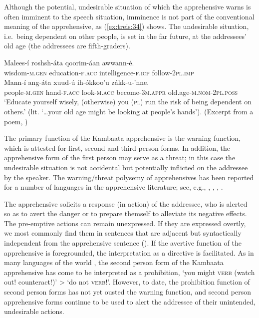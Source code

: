\documentclass[output=paper,colorlinks,citecolor=brown,
]{langsci/langscibook}
\begin{document}
Although the potential, undesirable situation of which the apprehensive warns is often imminent to the speech situation, imminence is not part of the conventional meaning of the apprehensive, as (\ref{ex:treis:34}) shows. The undesirable situation,  i.e.~being dependent on other people, is set in the far future, at the addressees' old age (the addressees are fifth-graders).

\ea\label{ex:treis:34} 
\gll Malees-í 			roshsh-áta 			qoorim-áan 		awwann-é. \\ 
wisdom-\textsc{m.gen} education-\textsc{f.acc}	intelligence-\textsc{f.icp}	follow-\textsc{2pl.imp}\\ \newline
\gll Mann-í 			ang-áta 		xuud-ú 		ih-ókkoo'u 			zákk-u-'nne. \\
people-\textsc{m.gen}	hand-\textsc{f.acc}	look-\textsc{m.acc}	become-\textsc{3m.appr}	old.age-\textsc{m.nom-2pl.poss}\\
\glt `Educate yourself wisely, (otherwise) you (\textsc{pl}) run the risk of being dependent on others.' (lit. `\ldots your old age might be looking at people's hands'). (Excerpt from a poem, \citealt[5.90]{KEB1989})
\z 

The primary function of the Kambaata apprehensive is the warning function, which is attested for first, second and third person forms. In addition, the apprehensive form of the first person may serve as a threat; in this case the undesirable situation is not accidental but potentially inflicted on the addressee by the speaker. The warning\slash threat polysemy of apprehensives has been reported for a number of languages in the apprehensive literature; see, e.g., \citet{lichtenberk1995}, \citet{FallerSchultzeBerndt2018u}, \citet{Vuillermet2018u, chapters/vuillermet},  \citet{chapters/introduction}.

The apprehensive solicits a response (in action) of the addressee, who is alerted so as to avert the danger or to prepare themself to alleviate its negative effects. The pre-emptive actions can remain unexpressed. If they are expressed overtly, we most commonly find them in sentences that are adjacent but syntactically independent from the apprehensive sentence (). If the avertive function of the apprehensive is foregrounded, the interpretation as a directive is facilitated. As in many languages of the world \citep{Dobrushina2006, pakendorfschalley2007}, the second person form of the Kambaata apprehensive has come to be interpreted as a prohibition, `you might \textsc{verb} (watch out! counteract!)' > `do not \textsc{verb}!'. However, to date, the prohibition function of second person forms has not yet ousted the warning function, and second person apprehensive forms continue to be used to alert the addressee of their unintended, undesirable actions.
\end{document}
